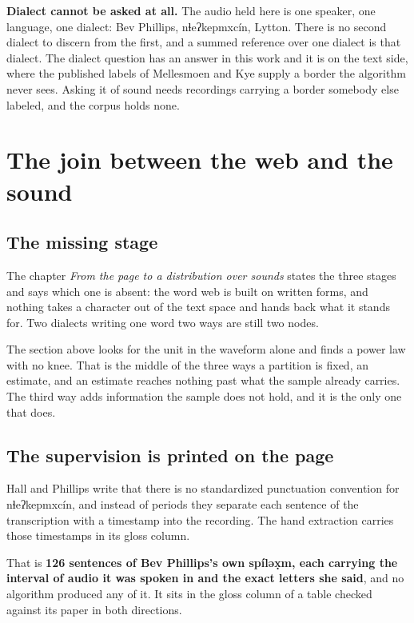 \textbf{Dialect cannot be asked at all.} The audio held here is one speaker, one language, one
dialect: Bev Phillips, nɬeʔkepmxcín, Lytton. There is no second dialect to discern from the first,
and a summed reference over one dialect is that dialect. The dialect question has an answer in this
work and it is on the text side, where the published labels of Mellesmoen and Kye
\cite{src:Mellesmoen-and-Kye-2026} supply a border the algorithm never sees. Asking it of sound needs
recordings carrying a border somebody else labeled, and the corpus holds none.

\section{The join between the web and the sound}

\subsection{The missing stage}

The chapter \emph{From the page to a distribution over sounds} states the three stages and says
which one is absent: the word web is built on written forms, and nothing takes a character out of the
text space and hands back what it stands for. Two dialects writing one word two ways are still two
nodes.

The section above looks for the unit in the waveform alone and finds a power law with no knee. That
is the middle of the three ways a partition is fixed, an estimate, and an estimate reaches nothing
past what the sample already carries. The third way adds information the sample does not hold, and
it is the only one that does.

\subsection{The supervision is printed on the page}

Hall and Phillips \cite{src:Hall-and-Phillips-2025} write that there is no standardized punctuation
convention for nɬeʔkepmxcín, and instead of periods they separate each sentence of the transcription
with a timestamp into the recording. The hand extraction carries those timestamps in its gloss
column.

That is \textbf{126 sentences of Bev Phillips's own spíləx̣m, each carrying the interval of audio it
was spoken in and the exact letters she said}, and no algorithm produced any of it. It sits in the
gloss column of a table checked against its paper in both directions.

